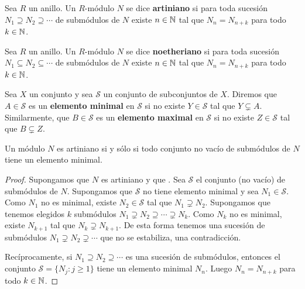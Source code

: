 \chapter{}

\begin{definition}
	Sea $R$ un anillo. 
	Un $R$-módulo $N$ se dice \textbf{artiniano} si para toda sucesión
	$N_1\supseteq N_2\supseteq\cdots$ de submódulos de $N$ existe $n\in\mathbb{N}$ tal
	que $N_n=N_{n+k}$ para todo $k\in\mathbb{N}$.
\end{definition}

\begin{definition}
	Sea $R$ un anillo. 
	Un $R$-módulo $N$ se dice \textbf{noetheriano} si para toda sucesión
	$N_1\subseteq N_2\subseteq\cdots$ de submódulos de $N$ existe $n\in\mathbb{N}$ tal
	que $N_n=N_{n+k}$ para todo $k\in\mathbb{N}$.
\end{definition}

Sea $X$ un conjunto y sea $\mathcal{S}$ un conjunto de subconjuntos de $X$.
Diremos que $A\in\mathcal{S}$ es un \textbf{elemento minimal} en $\mathcal{S}$
si no existe $Y\in\mathcal{S}$ tal que $Y\subsetneq A$. Similarmente, 
que $B\in\mathcal{S}$ es un \textbf{elemento maximal} en $\mathcal{S}$ si no
existe $Z\in\mathcal{S}$ tal que $B\subsetneq Z$.

\begin{lemma}
	\label{lem:modulo_artiniano}
	Un módulo $N$ es artiniano si y sólo si todo conjunto no
	vacío de submódulos de $N$ tiene un elemento minimal.
\end{lemma}

\begin{proof}
	Supongamos que $N$ es artiniano y que . Sea $\mathcal{S}$ el conjunto (no
	vacío) de submódulos de $N$. Supongamos que $\mathcal{S}$ no tiene elemento
	minimal y sea $N_1\in\mathcal{S}$.  Como $N_1$ no es minimal, existe
	$N_2\in\mathcal{S}$ tal que $N_1\supsetneq N_2$.  Supongamos que tenemos
	elegidos $k$ submódulos $N_1\supsetneq N_2\supseteq\cdots\supsetneq N_k$.
	Como $N_k$ no es minimal, existe $N_{k+1}$ tal que $N_k\supsetneq N_{k+1}$.
	De esta forma tenemos una sucesión de submódulos $N_1\supsetneq
	N_2\supsetneq\cdots$ que no se estabiliza, una contradicción.

	Recíprocamente, si $N_1\supseteq N_2\supseteq\cdots$ es una sucesión de
	submódulos, entonces el conjunto $\mathcal{S}=\{N_j:j\geq1\}$ tiene un
	elemento minimal $N_n$. Luego $N_n=N_{n+k}$ para todo $k\in\mathbb{N}$.
\end{proof}

